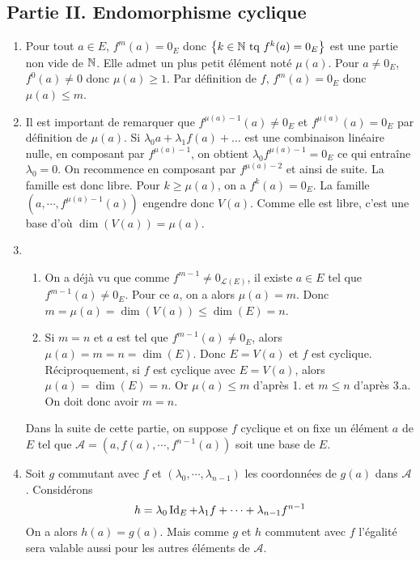 \subsection*{Partie II. Endomorphisme cyclique}
\begin{enumerate}
 \item Pour tout $a\in E$, $f^m(a)=0_E$ donc $\left\lbrace k\in \mathbb{N} \text{ tq } f^k(a) = 0_E\right\rbrace $ est une partie non vide de $\mathbb{N}$. Elle admet un plus petit élément noté $\mu(a)$. Pour $a\neq 0_E$, $f^0(a)\neq 0$ donc $\mu(a)\geq 1$. Par définition de $f$, $f^m(a)=0_E$ donc $\mu(a)\leq m$.
 \item Il est important de remarquer que $f^{\mu(a)-1}(a)\neq 0_E$ et $f^{\mu(a)}(a)= 0_E$ par définition de $\mu(a)$.\newline
Si $\lambda_0 a + \lambda_1 f(a) +\dots$ est une combinaison linéaire nulle, en composant par $f^{\mu(a)-1}$, on obtient $\lambda_0f^{\mu(a)-1}=0_E$ ce qui entraîne $\lambda_0=0$. On recommence en composant par $f^{\mu(a)-2}$ et ainsi de suite. La famille est donc libre.\newline
Pour $k\geq \mu(a)$, on a $f^k(a)=0_E$. La famille $(a,\cdots, f^{\mu(a)-1}(a))$ engendre donc $V(a)$. Comme elle est libre, c'est une base d'où $\dim(V(a))=\mu(a)$.
 \item
\begin{enumerate}
 \item On a déjà vu que comme $f^{m-1}\neq 0_{\mathcal{L}(E)}$, il existe $a\in E$ tel que $f^{m-1}(a)\neq 0_E$. Pour ce $a$, on a alors $\mu(a)=m$. Donc $m=\mu(a)=\dim(V(a))\leq \dim(E)=n$. 
 \item Si $m=n$ et $a$ est tel que $f^{m-1}(a)\neq 0_E$, alors $\mu(a)=m=n=\dim(E)$. Donc $E=V(a)$ et $f$ est cyclique.\newline
Réciproquement, si $f$ est cyclique avec $E=V(a)$, alors $\mu(a)=\dim(E)=n$. Or $\mu(a)\leq m$ d'après 1. et $m\leq n$ d'après 3.a. On doit donc avoir $m=n$.
\end{enumerate}
Dans la suite de cette partie, on suppose $f$ cyclique et on fixe un élément $a$ de $E$ tel que $\mathcal{A}=(a,f(a),\cdots, f^{n-1}(a))$ soit une base de $E$.
 \item Soit $g$ commutant avec $f$ et $(\lambda_0,\cdots,\lambda_{n-1})$ les coordonnées de $g(a)$ dans $\mathcal{A}$. Considérons
\begin{displaymath}
 h = \lambda_0\operatorname{Id}_E + \lambda_1 f + \cdots + \lambda_{n-1}f^{n-1}
\end{displaymath}
On a alors $h(a)=g(a)$. Mais comme $g$ et $h$ commutent avec $f$ l'égalité sera valable aussi pour les autres éléments de $\mathcal{A}$.

\end{enumerate}
